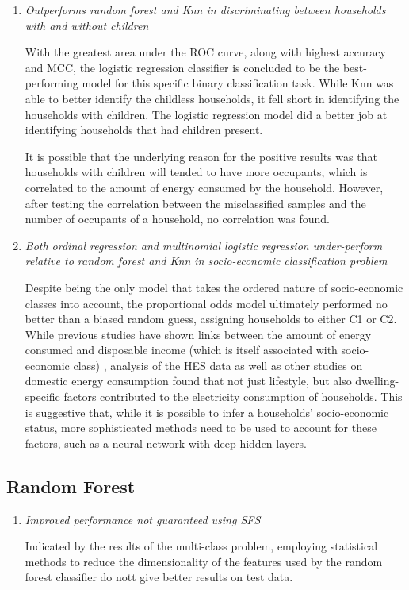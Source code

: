 \begin{enumerate}
\item \textit{Outperforms random forest and Knn in discriminating between households with and without children}

With the greatest area under the ROC curve, along with highest accuracy and MCC, the logistic regression classifier is concluded to be the best-performing model for this specific binary classification task. While Knn was able to better identify the childless households, it fell short in identifying the households with children.  The logistic regression model did a better job at identifying households that had children present. 

It is possible that the underlying reason for the positive results was that households with children will tended to have more occupants, which is correlated to the amount of energy consumed by the household\cite{early_findings}. However, after testing the correlation between the misclassified samples and the number of occupants of a household, no correlation was found.


\item \textit{Both ordinal regression and multinomial logistic regression under-perform relative to random forest and Knn in socio-economic classification problem}

Despite being the only model that takes the ordered nature of socio-economic classes into account, the proportional odds model ultimately performed no better than a biased random guess, assigning households to either C1 or C2. While previous studies have shown links between the amount of energy consumed and disposable income (which is itself associated with socio-economic class) \cite{McLoughlin}, analysis of the HES data as well as other studies on domestic energy consumption found that not just lifestyle, but also dwelling-specific factors contributed to the electricity consumption of households. This is suggestive that, while it is possible to infer a households' socio-economic status, more sophisticated methods need to be used to account for these factors, such as a neural network with deep hidden layers.
\end{enumerate}

\subsection{Random Forest}

\begin{enumerate}

\item \textit{Improved performance not guaranteed using SFS}

Indicated by the results of the multi-class problem, employing statistical methods to reduce the dimensionality of the features used by the random forest classifier do nott give better results on test data. 

\end{enumerate}

